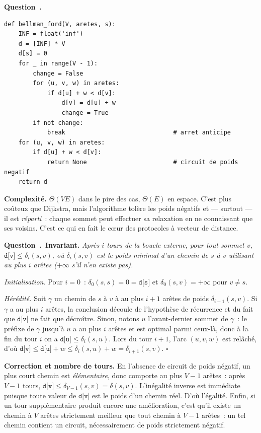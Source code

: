 \documentclass[11pt,a4paper]{article}
\renewcommand{\Q}{\medskip\par\stepcounter{qcnt}\noindent\textbf{\color{cnc}Question~\theqcnt.}~}
\begin{document}
\Q
\begin{lstlisting}
def bellman_ford(V, aretes, s):
    INF = float('inf')
    d = [INF] * V
    d[s] = 0
    for _ in range(V - 1):
        change = False
        for (u, v, w) in aretes:
            if d[u] + w < d[v]:
                d[v] = d[u] + w
                change = True
        if not change:
            break                              # arret anticipe
    for (u, v, w) in aretes:
        if d[u] + w < d[v]:
            return None                        # circuit de poids negatif
    return d
\end{lstlisting}
\textbf{Complexité.} $\Theta(V\!E)$ dans le pire des cas, $\Theta(E)$ en espace. C'est plus
coûteux que Dijkstra, mais l'algorithme tolère les poids négatifs et — surtout — il est
\emph{réparti}~: chaque sommet peut effectuer sa relaxation en ne connaissant que ses
voisins. C'est ce qui en fait le c\oe ur des protocoles à vecteur de distance.

\Q \textbf{Invariant.} \emph{Après $i$ tours de la boucle externe, pour tout sommet $v$,
$\texttt{d[v]}\le \delta_i(s,v)$, où $\delta_i(s,v)$ est le poids minimal d'un chemin de $s$ à
$v$ utilisant au plus $i$ arêtes ($+\infty$ s'il n'en existe pas).}

\emph{Initialisation.} Pour $i=0$~: $\delta_0(s,s)=0=\texttt{d[s]}$ et $\delta_0(s,v)=+\infty$
pour $v\ne s$.

\emph{Hérédité.} Soit $\gamma$ un chemin de $s$ à $v$ à au plus $i+1$ arêtes de poids
$\delta_{i+1}(s,v)$. Si $\gamma$ a au plus $i$ arêtes, la conclusion découle de l'hypothèse
de récurrence et du fait que $\texttt{d[v]}$ ne fait que décroître. Sinon, notons $u$
l'avant-dernier sommet de $\gamma$~: le préfixe de $\gamma$ jusqu'à $u$ a au plus $i$ arêtes
et est optimal parmi ceux-là, donc à la fin du tour $i$ on a $\texttt{d[u]}\le\delta_i(s,u)$.
Lors du tour $i+1$, l'arc $(u,v,w)$ est relâché, d'où
$\texttt{d[v]}\le\texttt{d[u]}+w\le\delta_i(s,u)+w=\delta_{i+1}(s,v)$. \hfill$\square$

\textbf{Correction et nombre de tours.} En l'absence de circuit de poids négatif, un plus
court chemin est \emph{élémentaire}, donc comporte au plus $V-1$ arêtes~: après $V-1$ tours,
$\texttt{d[v]}\le\delta_{V-1}(s,v)=\delta(s,v)$. L'inégalité inverse est immédiate puisque
toute valeur de $\texttt{d[v]}$ est le poids d'un chemin réel. D'où l'égalité. Enfin, si un
tour supplémentaire produit encore une amélioration, c'est qu'il existe un chemin à $V$
arêtes strictement meilleur que tout chemin à $V-1$ arêtes~: un tel chemin contient un
circuit, nécessairement de poids strictement négatif.
\end{document}
